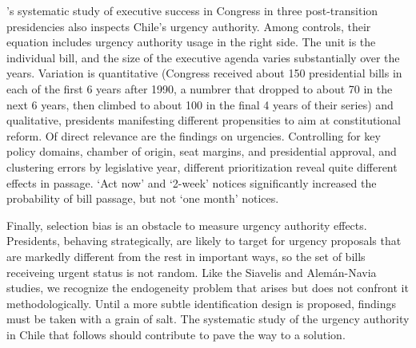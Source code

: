\citeauthor{aleman.navia.UrgChi.2009}'s \citeyearpar{aleman.navia.UrgChi.2009} systematic study of executive success in Congress in three post-transition presidencies also inspects Chile's urgency authority. Among controls, their equation includes urgency authority usage in the right side. The unit is the individual bill, and the size of the executive agenda varies substantially over the years. Variation is quantitative  (Congress received about 150 presidential bills in each of the first 6 years after 1990, a numbrer that dropped to about 70 in the next 6 years, then climbed to about 100 in the final 4 years of their series) and qualitative, presidents manifesting different propensities to aim at constitutional reform. Of direct relevance are the findings on urgencies. Controlling for key policy domains, chamber of origin, seat margins, and presidential approval, and clustering errors by legislative year, different prioritization reveal quite different effects in passage. `Act now' and `2-week' notices significantly increased the probability of bill passage, but not `one month' notices. 

Finally, selection bias is an obstacle to measure urgency authority effects. Presidents, behaving strategically, are likely to target for urgency proposals that are markedly different from the rest in important ways, so the set of bills receiveing urgent status is not random. Like the Siavelis and Alemán-Navia studies, we recognize the endogeneity problem that arises but does not confront it methodologically. Until a more subtle identification design is proposed, findings must be taken with a grain of salt. The systematic study of the urgency authority in Chile that follows should contribute to pave the way to a solution. 






